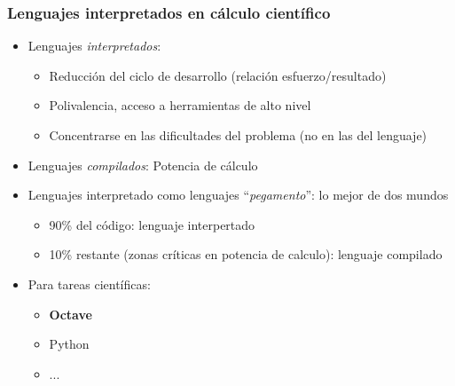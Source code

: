 \hypertarget{qu-es-octave-ii}{}
\begin{frame}\frametitle{Lenguajes interpretados en cálculo científico}

\begin{itemize}
\item {} 
Lenguajes \emph{interpretados}:
\begin{itemize}
\item {} 
Reducción del ciclo de desarrollo (relación esfuerzo/resultado)

\item {} 
Polivalencia, acceso a herramientas de alto nivel

\item {}
Concentrarse en las dificultades del problema (no en
  las del lenguaje)

\end{itemize}

\item {} 
Lenguajes \emph{compilados}: Potencia de cálculo

\item {} 
Lenguajes interpretado como lenguajes ``\emph{pegamento}'': lo mejor de dos mundos
\begin{itemize}
\item 90\% del código: lenguaje interpertado
\item 10\% restante (zonas críticas en potencia de calculo): lenguaje
  compilado
\end{itemize}
\item Para tareas científicas:
\begin{itemize}
\item \textbf{Octave}
\item Python
\item ...
\end{itemize}
\end{itemize}

\end{frame}



